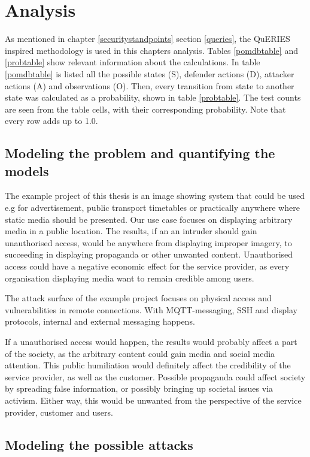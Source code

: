 \chapter{Analysis} \label{analysis}

As mentioned in chapter \ref{securitystandpoints} section
\ref{queries}, the QuERIES inspired methodology is used in this
chapters analysis. Tables \ref{pomdbtable} and \ref{probtable} show
relevant information about the calculations. In table \ref{pomdbtable}
is listed all the possible states (S), defender actions (D), attacker
actions (A) and observations (O). Then, every transition from state to
another state was calculated as a probability, shown in table
\ref{probtable}. The test counts are seen from the table cells, with
their corresponding probability. Note that every row adds up to 1.0.

\section{Modeling the problem and quantifying the models} \label{modprob}

The example project of this thesis is an image showing system that
could be used e.g for advertisement, public transport timetables or
practically anywhere where static media should be presented. Our use
case focuses on displaying arbitrary media in a public location. The
results, if an an intruder should gain unauthorised access, would be
anywhere from displaying improper imagery, to succeeding in displaying
propaganda or other unwanted content. Unauthorised access could have a
negative economic effect for the service provider, as every
organisation displaying media want to remain credible among users.

The attack surface of the example project focuses on physical access
and vulnerabilities in remote connections. With MQTT-messaging, SSH
and display protocols, internal and external messaging
happens.

If a unauthorised access would happen, the results would probably
affect a part of the society, as the arbitrary content could gain
media and social media attention. This public humiliation would
definitely affect the credibility of the service provider, as well as
the customer. Possible propaganda could affect society by spreading
false information, or possibly bringing up societal issues via
activism. Either way, this would be unwanted from the perspective of
the service provider, customer and users.

\section{Modeling the possible attacks}

